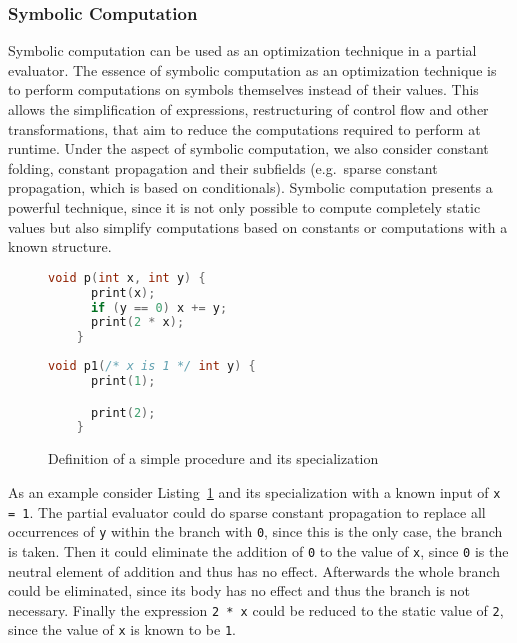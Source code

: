 \subsubsection*{Symbolic Computation}

Symbolic computation can be used as an optimization technique in a partial evaluator.
The essence of symbolic computation as an optimization technique is to perform computations on symbols themselves instead of their values.
This allows the simplification of expressions, restructuring of control flow and other transformations, that aim to reduce the computations required to perform at runtime.
Under the aspect of symbolic computation, we also consider constant folding, constant propagation and their subfields (e.g.\ sparse constant propagation, which is based on conditionals).
Symbolic computation presents a powerful technique, since it is not only possible to compute completely static values but also simplify computations based on constants or computations with a known structure.

\begin{figure}[h]
  \setcounter{figure}{0}
  \setcounter{lstlisting}{1}
  \renewcommand\figurename{Listing}
\noindent\begin{minipage}{.45\textwidth}
  \begin{lstlisting}[language=c,autogobble=true]
    void p(int x, int y) {
      print(x);
      if (y == 0) x += y;
      print(2 * x);
    }
  \end{lstlisting}
\end{minipage}\hfill
\begin{minipage}{.45\textwidth}
  \begin{lstlisting}[language=c,autogobble=true]
    void p1(/* x is 1 */ int y) {
      print(1);

      print(2);
    }
  \end{lstlisting}
\end{minipage}
  \caption{Definition of a simple procedure and its specialization}\label{lst:symbolic-computation}
\end{figure}


As an example consider Listing~\ref{lst:symbolic-computation} and its specialization with a known input of \texttt{x = 1}.
The partial evaluator could do sparse constant propagation to replace all occurrences of \texttt{y} within the branch with \texttt{0}, since this is the only case, the branch is taken.
Then it could eliminate the addition of \texttt{0} to the value of \texttt{x}, since \texttt{0} is the neutral element of addition and thus has no effect.
Afterwards the whole branch could be eliminated, since its body has no effect and thus the branch is not necessary.
Finally the expression \texttt{2 * x} could be reduced to the static value of \texttt{2}, since the value of \texttt{x} is known to be \texttt{1}.

